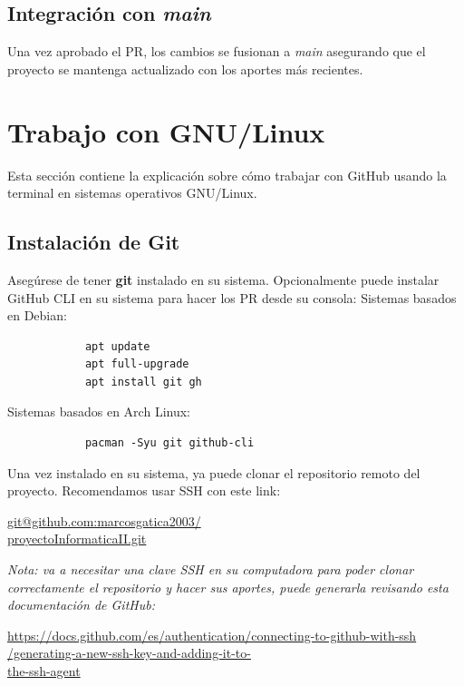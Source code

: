 \documentclass[a4paper]{article}
\begin{document}
    \subsection{Integración con \textit{main}}
        Una vez aprobado el PR, los cambios se fusionan a \textit{main} asegurando que el proyecto se mantenga actualizado con los aportes más recientes.
        
\section{Trabajo con GNU/Linux}
\indent Esta sección contiene la explicación sobre cómo trabajar con GitHub usando la terminal en sistemas operativos GNU/Linux.
\subsection{Instalación de Git}
    Asegúrese de tener \textbf{git} instalado en su sistema. Opcionalmente puede instalar GitHub CLI en su sistema para hacer los PR desde su consola:
    \newline
    Sistemas basados en Debian:
    \begin{center}
        \begin{lstlisting}
            apt update 
            apt full-upgrade 
            apt install git gh 
        \end{lstlisting}
    \end{center}
    Sistemas basados en Arch Linux:
    \begin{center}
        \begin{lstlisting}
            pacman -Syu git github-cli
        \end{lstlisting}
    \end{center}
\thispagestyle{fancy}
\indent Una vez instalado en su sistema, ya puede clonar el repositorio remoto del proyecto. Recomendamos usar SSH con este link: 

\newpage
\thispagestyle{fancy}
\begin{center}
    \url{git@github.com:marcosgatica2003/} \\
    \url{proyectoInformaticaII.git} \\
\end{center}

\textit{Nota: va a necesitar una clave SSH en su computadora para poder clonar correctamente el repositorio y hacer sus aportes, puede generarla revisando esta documentación de GitHub:}

\begin{center}
    \url{https://docs.github.com/es/authentication/connecting-to-github-with-ssh} \\
    \url{/generating-a-new-ssh-key-and-adding-it-to-} \\
    \url{the-ssh-agent} \\
\end{center}
\end{document}
